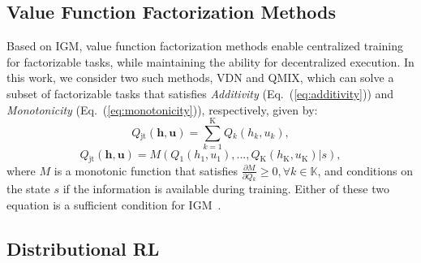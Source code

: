 \documentclass{article}
\newcommand{\state}{s}
\newcommand{\jointaction}{\mathbf{u}}
\newcommand{\action}{u}
\newcommand{\jointobservationhistory}{\mathbf{h}}
\newcommand{\observationhistory}{h}
\newcommand{\agentspace}{\mathbb{K}}
\newcommand{\agentcounter}{k}
\newcommand{\numberofagents}{\mathrm{K}}
\newcommand{\utilityexp}{Q}
\newcommand{\joint}{\mathrm{jt}}
\newcommand{\monotonicfunction}{M}
\newcommand{\additivity}{\textit{Additivity}}
\newcommand{\monotonicity}{\textit{Monotonicity}}
\begin{document}
\subsection{Value Function Factorization Methods}
\label{subsec:background_value_factorization_methods}
Based on IGM, value function factorization methods enable centralized training for factorizable tasks, while maintaining the ability for decentralized execution. In this work, we consider two such methods, VDN and QMIX, which can solve a subset of factorizable tasks that satisfies \additivity{} (Eq.~(\ref{eq:additivity})) and \monotonicity{} (Eq.~(\ref{eq:monotonicity})), respectively, given by:
\begin{equation} \utilityexp{}_{\joint{}}(\jointobservationhistory{},\jointaction{}) = \sum^{\numberofagents{}}_{\agentcounter{}=1} \utilityexp{}_\agentcounter{}(\observationhistory{}_\agentcounter{},\action{}_\agentcounter{}),
\label{eq:additivity}
\end{equation}
\begin{equation} \utilityexp{}_{\joint{}}(\jointobservationhistory{},\jointaction{}) = \monotonicfunction(\utilityexp{}_1(\observationhistory{}_1,\action{}_1),...,\utilityexp{}_\numberofagents{}(\observationhistory{}_\numberofagents{},\action{}_\numberofagents{})\vert\state),
\label{eq:monotonicity}
\end{equation}
where $\monotonicfunction$ is a monotonic function that satisfies $\frac{\partial \monotonicfunction}{\partial \utilityexp{}_\agentcounter{}}\ge 0, \forall \agentcounter{}\in\agentspace{}$, and conditions on the state $\state$ if the information is available during training. Either of these two equation is a sufficient condition for IGM~\cite{Son2019QTRAN}.



\subsection{Distributional RL}
\label{subsec:background_distributional_rl}
\end{document}
